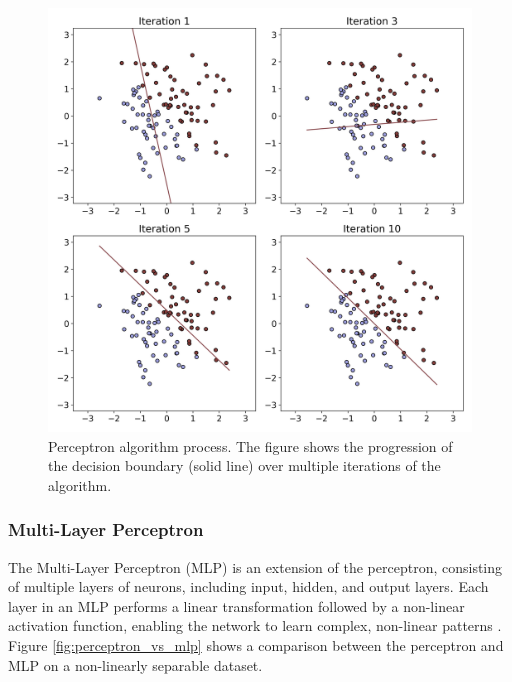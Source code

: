 \documentclass[english,11pt,a4paper,titlepage]{article}
\begin{document}
	\begin{figure}[h]
		\centering
		\includegraphics[width=0.8\linewidth]{img/perceptron.png}
		\caption{Perceptron algorithm process. The figure shows the progression of the decision boundary (solid line) over multiple iterations of the algorithm.}
		\label{fig:perceptron_algorithm}
	\end{figure}
	
	\subsubsection*{Multi-Layer Perceptron}
	The Multi-Layer Perceptron (MLP) is an extension of the perceptron, consisting of multiple layers of neurons, including input, hidden, and output layers. Each layer in an MLP performs a linear transformation followed by a non-linear activation function, enabling the network to learn complex, non-linear patterns \cite{hintonConnectionistLearningProcedures1989}. Figure \ref{fig:perceptron_vs_mlp} shows a comparison between the perceptron and MLP on a non-linearly separable dataset.
	
\end{document}

